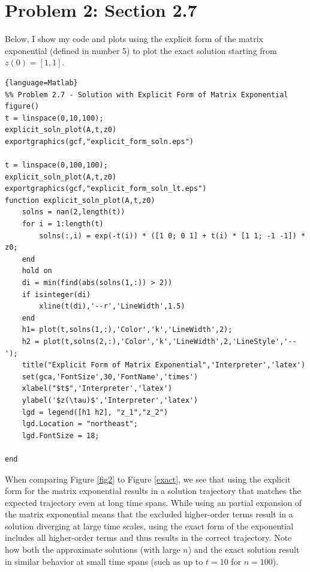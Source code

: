 \documentclass[11pt]{article}
\begin{document}
\section*{Problem 2: Section 2.7}
Below, I show my code and plots using the explicit form of the matrix exponential (defined in number 5) to plot the exact solution starting from $z(0) = [1,1]$.

\begin{lstlisting}{language=Matlab}
%% Problem 2.7 - Solution with Explicit Form of Matrix Exponential
figure()
t = linspace(0,10,100);
explicit_soln_plot(A,t,z0)
exportgraphics(gcf,"explicit_form_soln.eps")

t = linspace(0,100,100);
explicit_soln_plot(A,t,z0)
exportgraphics(gcf,"explicit_form_soln_lt.eps")
function explicit_soln_plot(A,t,z0)
    solns = nan(2,length(t))
    for i = 1:length(t)
        solns(:,i) = exp(-t(i)) * ([1 0; 0 1] + t(i) * [1 1; -1 -1]) * z0;
    end 
    hold on
    di = min(find(abs(solns(1,:)) > 2))
    if isinteger(di)
        xline(t(di),'--r','LineWidth',1.5)
    end 
    h1= plot(t,solns(1,:),'Color','k','LineWidth',2);
    h2 = plot(t,solns(2,:),'Color','k','LineWidth',2,'LineStyle','--');
    title("Explicit Form of Matrix Exponential",'Interpreter','latex')
    set(gca,'FontSize',30,'FontName','times')
    xlabel("$t$",'Interpreter','latex')
    ylabel('$z(\tau)$','Interpreter','latex')
    lgd = legend([h1 h2], "z_1","z_2")
    lgd.Location = "northeast";
    lgd.FontSize = 18;
    
end 
\end{lstlisting}
 When comparing Figure \ref{fig2} to Figure \ref{exact}, we see that using the explicit form for the matrix exponential results in a solution trajectory that matches the expected trajectory even at long time spans. While using an partial expansion of the matrix exponential means that the excluded higher-order terms result in a solution diverging at large time scales, using the exact form of the exponential includes all higher-order terms and thus results in the correct trajectory. Note how both the approximate solutions (with large $n$) and the exact solution result in similar behavior at small time spans (such as up to $t = 10$ for $n = 100$).
 
\end{document}

